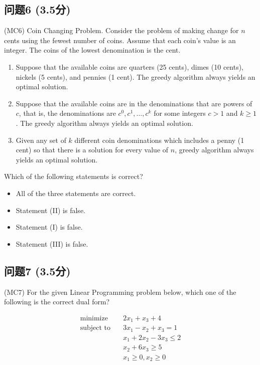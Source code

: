 \documentclass[11pt, a4paper]{article}
\begin{document}
\subsection*{问题6 (3.5分)}
(MC6) Coin Changing Problem. Consider the problem of making change for \(n\) cents using the fewest number of coins. Assume that each coin's value is an integer. The coins of the lowest denomination is the cent.

\begin{enumerate}[label=(\Roman*), leftmargin=*]
    \item Suppose that the available coins are quarters (25 cents), dimes (10 cents), nickels (5 cents), and pennies (1 cent). The greedy algorithm always yields an optimal solution.
    \item Suppose that the available coins are in the denominations that are powers of \(c\), that is, the denominations are \(c^0, c^1, \ldots, c^k\) for some integers \(c > 1\) and \(k \geq 1\). The greedy algorithm always yields an optimal solution.
    \item Given any set of \(k\) different coin denominations which includes a penny (1 cent) so that there is a solution for every value of \(n\), greedy algorithm always yields an optimal solution.
\end{enumerate}

Which of the following statements is correct?

\begin{itemize}
    \item All of the three statements are correct.
    \item Statement (II) is false.
    \item Statement (I) is false.
    \item Statement (III) is false.
\end{itemize}

\subsection*{问题7 (3.5分)}
(MC7) For the given Linear Programming problem below, which one of the following is the correct dual form?

\begin{align*}
\text{minimize} \quad & 2x_1 + x_3 + 4 \\
\text{subject to} \quad & 3x_1 - x_2 + x_3 = 1 \\
& x_1 + 2x_2 - 3x_3 \leq 2 \\
& x_2 + 6x_3 \geq 5 \\
& x_1 \geq 0, x_2 \geq 0
\end{align*}
\end{document}
